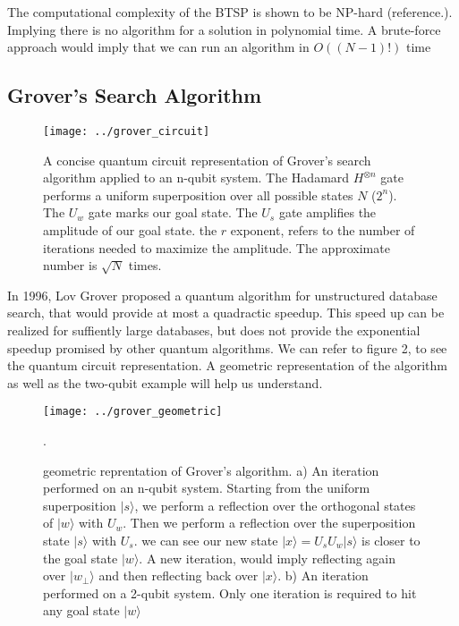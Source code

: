 \documentclass[twocolumn,showpacs,preprintnumbers,amsmath,amssymb]{revtex4}
\begin{document}
		The computational complexity of the BTSP is shown to be NP-hard (reference.). Implying there is no algorithm for a solution in polynomial time. A brute-force approach would imply that we can run an algorithm in $O((N-1)!)$ time
		
		\subsection{Grover's Search Algorithm}
		
		\begin{figure}[!h]
			\centering
			\texttt{[image: ../grover\_circuit]}
			\caption{A concise quantum circuit representation of Grover's search algorithm applied to an n-qubit system. The Hadamard $H^{\otimes n }$ gate performs a uniform superposition over all possible states $N$ ($2^n$). The $U_w$ gate marks our goal state. The $U_s$ gate amplifies the amplitude of our goal state. the $r$ exponent, refers to the number of iterations needed to maximize the amplitude. The approximate number is $\sqrt{N}$ times.}
			\label{fig:grovercircuit}
		\end{figure}
		
		In 1996, Lov Grover proposed a quantum algorithm for unstructured database search, that would provide at most a quadractic speedup. This speed up can be realized for suffiently large databases, but does not provide the exponential speedup promised by other quantum algorithms. We can refer to figure 2, to see the quantum circuit representation.
		A geometric representation of the algorithm as well as the two-qubit example will help us understand. 
		
		
		\begin{figure}[!h]
			\centering
			\texttt{[image: ../grover\_geometric]}
			\caption{geometric reprentation of Grover's algorithm.  a) An iteration performed on an n-qubit system.  Starting from the uniform superposition $|s\rangle$, we perform a reflection over the orthogonal states of $|w\rangle$ with $U_w$. Then we perform a reflection over the superposition state $|s\rangle$ with $U_s$. we can see our new state $|x\rangle = U_sU_w|s\rangle$ is closer to the goal state $|w\rangle$. A new iteration, would imply reflecting again over $|w_\perp\rangle$ and then reflecting back over $|x\rangle$. b) An iteration performed on a 2-qubit system. Only one iteration is required to hit any goal state $|w\rangle$ }
			\label{fig:grovergeometric}. 
		\end{figure}
		
\end{document}

